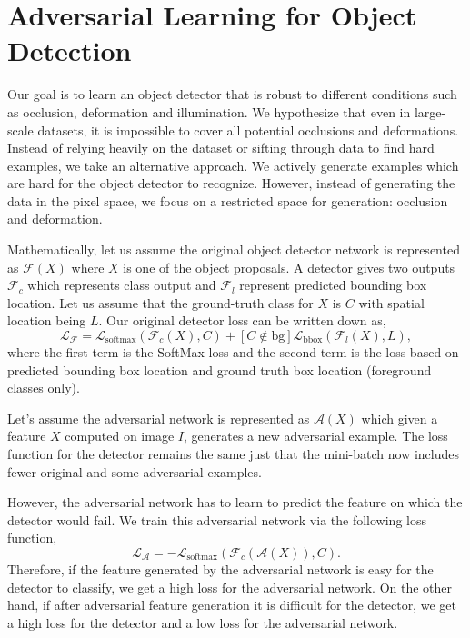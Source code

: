 \section{Adversarial Learning for Object Detection}
Our goal is to learn an object detector that is robust to different conditions such as occlusion, deformation and illumination. We hypothesize that even in large-scale datasets, it is impossible to cover all potential occlusions and deformations. Instead of relying heavily on the dataset or sifting through data to find hard examples, we take an alternative approach. We actively generate examples which are hard for the object detector to recognize. However, instead of generating the data in the pixel space, we focus on a restricted space for generation: occlusion and deformation.

Mathematically, let us assume the original object detector network is represented as $\mathcal{F}(X)$ where $X$ is one of the object proposals. A detector gives two outputs $\mathcal{F}_c$ which represents class output and $\mathcal{F}_l$ represent predicted bounding box location. Let us assume that the ground-truth class for $X$ is $C$ with spatial location being $L$. Our original detector loss can be written down as, 
{\small
\begin{equation}
    \nonumber
    \mathcal{L}_\mathcal{F} = \mathcal{L}_{\text{softmax}}(\mathcal{F}_c(X), C) + \left[C \notin \text{bg}\right] \mathcal{L}_{\text{bbox}}(\mathcal{F}_l(X), L), 
\end{equation}
}
where the first term is the SoftMax loss and the second term is the loss based on predicted bounding box location and ground truth box location (foreground classes only). 

Let's assume the adversarial network is represented as $\mathcal{A}(X)$ which given a feature $X$ computed on image $I$, generates a new adversarial example. The loss function for the detector remains the same just that the mini-batch now includes fewer original and some adversarial examples. 

However, the adversarial network has to learn to predict the feature on which the detector would fail. We train this adversarial network via the following loss function,
{\small
\begin{equation}
    \nonumber
    \mathcal{L}_\mathcal{A} = - \mathcal{L}_{\text{softmax}}(\mathcal{F}_c(\mathcal{A}(X)), C).
\end{equation}
}
Therefore, if the feature generated by the adversarial network is easy for the detector to classify, we get a high loss for the adversarial network. On the other hand, if after adversarial feature generation it is difficult for the detector, we get a high loss for the detector and a low loss for the adversarial network.





